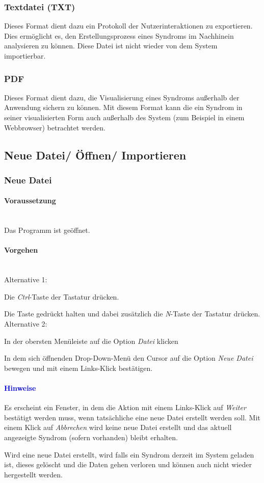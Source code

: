 \documentclass[enabledeprecatedfontcommands,fontsize=11pt,paper=a4,twoside]{scrartcl}
\newcounter{one}
\newcounter{two}[one]
\newcommand*{\hint}{\paragraph{\textcolor{blue}{Hinweise}}}
\newcommand*{\condition}{\paragraph{Voraussetzung}$\;$ \vspace{0.2cm}\\}
\newcommand*{\actions}{\paragraph{Vorgehen} $\;$\vspace{0.2cm}\\}
\newcommand*{\aOne}{\textcolor{bbe}{Alternative 1:}}
\newcommand*{\aTwo}{\textcolor{bbe}{Alternative 2:}}
\let\tempone\itemize
\let\temptwo\enditemize
\renewenvironment{itemize}{\tempone\addtolength{\itemsep}{-10.0pt}}{\temptwo}
\let\origenumerate\enumerate
\let\origendenumerate\endenumerate
\renewenvironment{enumerate}{\origenumerate \addtolength{\itemsep}{-10.0pt}}{\origendenumerate}
\begin{document}
	\subsubsection{Textdatei (TXT)}
	Dieses Format dient dazu ein Protokoll der Nutzerinteraktionen zu exportieren. Dies ermöglicht es, den Erstellungsprozess eines Syndroms im Nachhinein analysieren zu können. Diese Datei ist nicht wieder von dem System importierbar. 
	
	\subsubsection{PDF}
	Dieses Format dient dazu, die Visualisierung eines Syndroms außerhalb der Anwendung sichern zu können. Mit diesem Format kann die ein Syndrom in seiner visualisierten Form auch außerhalb des System (zum Beispiel in einem Webbrowser) betrachtet werden. 
	
\newpage	
\subsection{Neue Datei/ Öffnen/ Importieren} \label{import}
	
\subsubsection{Neue Datei}
		\condition 	
		Das Programm ist geöffnet.
		\actions
		\aOne
		\begin{enumerate}
				\item Die \textit{Ctrl}-Taste der Tastatur drücken.
				\item Die Taste gedrückt halten und dabei zusätzlich die \textit{N}-Taste der Tastatur drücken.
		\end{enumerate}				
		\aTwo
		\begin{enumerate}
				\item In der obersten Menüleiste auf die Option \textit{Datei} klicken 
				\item In dem sich öffnenden Drop-Down-Menü den Cursor auf die Option \textit{Neue Datei} bewegen und mit einem Links-Klick bestätigen.
		\end{enumerate}		
		\hint
		\begin{itemize}
				\item Es erscheint ein Fenster, in dem die Aktion mit einem Links-Klick auf \textit{Weiter} bestätigt werden muss, wenn tatsächliche eine neue Datei erstellt werden soll. Mit einem Klick auf \textit{Abbrechen} wird keine neue Datei erstellt und das aktuell angezeigte Syndrom (sofern vorhanden) bleibt erhalten.
				\item Wird eine neue Datei erstellt, wird falls ein Syndrom derzeit im System geladen ist, dieses gelöscht und die Daten gehen verloren und können auch nicht wieder hergestellt werden. \\
		\end{itemize}
		
\end{document}
